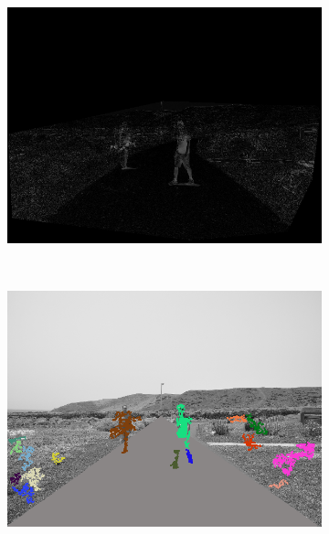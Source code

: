 \begin{figure}[h!]
\begin{subfigure}[b]{0.24\columnwidth}
	    \includegraphics[width=\textwidth]{pipeline/fig2}\label{fig:pipelineA_3}
        \end{subfigure}%
        ~
        \begin{subfigure}[b]{0.24\columnwidth}
	    \includegraphics[width=\textwidth]{pipeline/fig3}\label{fig:pipelineA_4}
        \end{subfigure}%
        \\
        \begin{subfigure}[b]{0.24\columnwidth}

\end{subfigure}
\end{figure}
